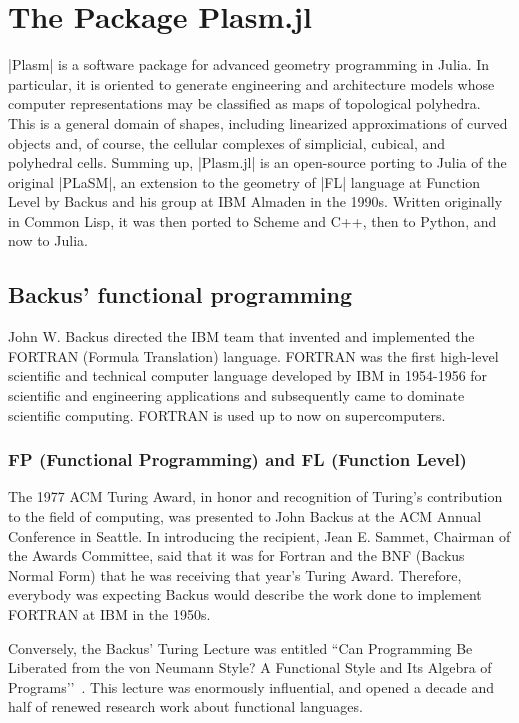 
\chapter{The Package Plasm.jl}
\label{chapt:2}

|Plasm| is a software package for advanced geometry programming in Julia. In particular, it is oriented to generate engineering and architecture models whose computer representations may be classified as maps of topological polyhedra. This is a general domain of shapes, including linearized approximations of curved objects and, of course, the cellular complexes of simplicial, cubical, and polyhedral cells. Summing up, |Plasm.jl| is an open-source porting to Julia of the original |PLaSM|, an extension to the geometry of |FL| language at Function Level by Backus and his group at IBM Almaden in the 1990s. Written originally in Common Lisp, it was then ported to Scheme and C++, then to Python, and now to Julia.


\section{Backus' functional programming}\label{sect:2-1}

John W. Backus directed the IBM team that invented and implemented the FORTRAN (Formula Translation) language. FORTRAN was the first high-level scientific and technical computer language developed by IBM in 1954-1956 for scientific and engineering applications and subsequently came to dominate scientific computing.  FORTRAN is used up to now on supercomputers.

\subsection*{FP (Functional Programming) and FL (Function Level)}


The 1977 ACM Turing Award, in honor and recognition of Turing’s contribution to the field of computing, was presented to John Backus at the ACM Annual Conference in Seattle. In introducing the recipient, Jean E. Sammet, Chairman of the Awards Committee, said that  
it was for Fortran and the BNF (Backus Normal Form) that he was receiving that year's Turing Award.
Therefore, everybody was expecting Backus would describe the  work done to implement FORTRAN at IBM in the 1950s.

Conversely, the Backus’ Turing Lecture was entitled ``Can Programming Be Liberated from the von Neumann Style? A Functional Style and Its Algebra of Programs’’~\cite{10.1145/359576.359579}. This lecture was enormously influential, and opened a decade and half of renewed research work about functional languages. 



